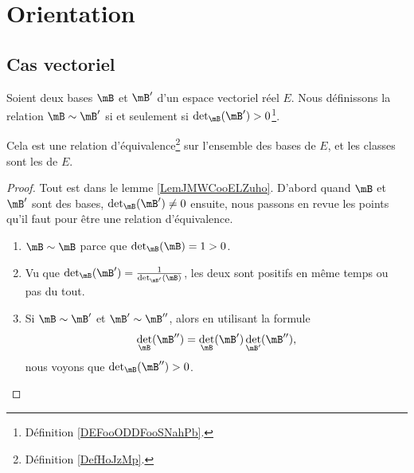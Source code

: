 \section{Orientation}

\subsection{Cas vectoriel}

\begin{propositionDef}        \label{DEFooNVRHooEBHUSu}
	Soient deux bases \( \mB\) et \( \mB'\) d'un espace vectoriel réel \( E\). Nous définissons la relation \( \mB\sim \mB'\) si et seulement si \( \det_{\mB}(\mB')>0\)\footnote{Définition \ref{DEFooODDFooSNahPb}.}.

	Cela est une relation d'équivalence\footnote{Définition \ref{DefHoJzMp}.} sur l'ensemble des bases de \( E\), et les classes sont les  de \( E\).
\end{propositionDef}

\begin{proof}
	Tout est dans le lemme \ref{LemJMWCooELZuho}. D'abord quand \( \mB\) et \( \mB'\) sont des bases, \( \det_{\mB}(\mB')\neq 0\) ensuite, nous passons en revue les points qu'il faut pour être une relation d'équivalence.
	\begin{enumerate}
		\item
		      \( \mB\sim \mB\) parce que \( \det_{\mB}(\mB)=1>0\).
		\item
		      Vu que \( \det_{\mB}(\mB')=\frac{1}{ \det_{\mB'}(\mB) }\), les deux sont positifs en même temps ou pas du tout.
		\item
		      Si \( \mB\sim \mB'\) et \( \mB'\sim\mB''\), alors en utilisant la formule
		      \begin{equation}
			      \det_{\mB}(\mB'')=\det_{\mB}(\mB')\det_{\mB'}(\mB''),
		      \end{equation}
		      nous voyons que \( \det_{\mB}(\mB'')>0\).
	\end{enumerate}
\end{proof}

